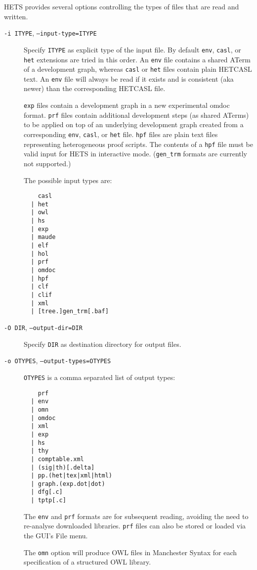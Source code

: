 \documentclass{article}
\newcommand{\normalTEXTSC}[2]{{#1\scriptsize#2}}
\newcommand     {\Hets}{\normalTEXTSC{H}{ETS}\xspace}
\newcommand{\HetCASL}{\normalTEXTSC{H}{ET}\normalTEXTSC{C}{ASL}\xspace}
\begin{document}
\Hets provides several options controlling the types of files
that are read and written.
\begin{description}
\item[\texttt{-i ITYPE}, \texttt{--input-type=ITYPE}] Specify \texttt{ITYPE}
  as explicit type of the input file.  By default \texttt{env}, \texttt{casl},
  or \texttt{het} extensions are tried in this order.  An \texttt{env} file
  contains a shared ATerm of a development graph, whereas \texttt{casl} or
  \texttt{het} files contain plain \HetCASL text. An \texttt{env} file will
  always be read if it exists and is consistent (aka newer) than the
  corresponding \HetCASL file.

  \texttt{exp} files contain a development graph in a new experimental omdoc
  format.  \texttt{prf} files contain additional development steps (as shared
  ATerms) to be applied on top of an underlying development graph created from
  a corresponding \texttt{env}, \texttt{casl}, or \texttt{het}
  file. \texttt{hpf} files are plain text files representing heterogeneous
  proof scripts. The contents of a \texttt{hpf} file must be valid input for
  \Hets in interactive mode.  (\texttt{gen\_trm} formats are currently not
  supported.)

The possible input types are:
\begin{verbatim}
    casl
  | het
  | owl
  | hs
  | exp
  | maude
  | elf
  | hol
  | prf
  | omdoc
  | hpf
  | clf
  | clif
  | xml
  | [tree.]gen_trm[.baf]
\end{verbatim}

\item[\texttt{-O DIR}, \texttt{--output-dir=DIR}]
Specify \texttt{DIR} as destination directory for output files.

\item[\texttt{-o OTYPES}, \texttt{--output-types=OTYPES}]
\texttt{OTYPES} is a comma separated list of output types:
\begin{verbatim}
    prf
  | env
  | omn
  | omdoc
  | xml
  | exp
  | hs
  | thy
  | comptable.xml
  | (sig|th)[.delta]
  | pp.(het|tex|xml|html)
  | graph.(exp.dot|dot)
  | dfg[.c]
  | tptp[.c]
\end{verbatim}
The \texttt{env} and \texttt{prf} formats are for subsequent reading,
avoiding the need to re-analyse downloaded libraries. \texttt{prf} files
can also be stored or loaded via the GUI's File menu.

The \texttt{omn} option \cite{books/sp/Kohlhase06} will produce OWL files in
Manchester Syntax for each specification of a structured OWL library.


\end{description}
\end{document}
